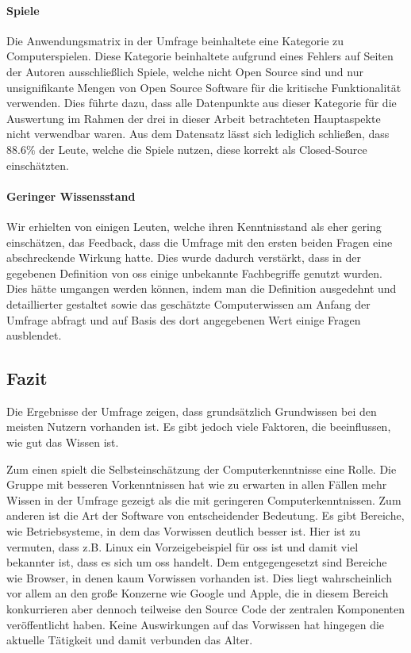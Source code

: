 \documentclass[a4paper]{article}
\begin{document}
            \paragraph{Spiele}
                Die Anwendungsmatrix in der Umfrage beinhaltete eine Kategorie zu Computerspielen. Diese Kategorie beinhaltete aufgrund eines Fehlers auf Seiten der Autoren ausschließlich Spiele, welche nicht Open Source sind und nur unsignifikante Mengen von Open Source Software für die kritische Funktionalität verwenden. Dies führte dazu, dass alle Datenpunkte aus dieser Kategorie für die Auswertung im Rahmen der drei in dieser Arbeit betrachteten Hauptaspekte nicht verwendbar waren. Aus dem Datensatz lässt sich lediglich schließen, dass $88.6\%$ der Leute, welche die Spiele nutzen, diese korrekt als Closed-Source einschätzten.
                
            \paragraph{Geringer Wissensstand}
                Wir erhielten von einigen Leuten, welche ihren Kenntnisstand als eher gering einschätzen, das Feedback, dass die Umfrage mit den ersten beiden Fragen eine abschreckende Wirkung hatte. Dies wurde dadurch verstärkt, dass in der gegebenen Definition von \gls{oss} einige unbekannte Fachbegriffe genutzt wurden. Dies hätte umgangen werden können, indem man die Definition ausgedehnt und detaillierter gestaltet sowie das geschätzte Computerwissen am Anfang der Umfrage abfragt und auf Basis des dort angegebenen Wert einige Fragen ausblendet.
            
        \subsection{Fazit}
            Die Ergebnisse der Umfrage zeigen, dass grundsätzlich Grundwissen bei den meisten Nutzern vorhanden ist. Es gibt jedoch viele Faktoren, die beeinflussen, wie gut das Wissen ist.
            
            Zum einen spielt die Selbsteinschätzung der Computerkenntnisse eine Rolle. Die Gruppe mit besseren Vorkenntnissen hat wie zu erwarten in allen Fällen mehr Wissen in der Umfrage gezeigt als die mit geringeren Computerkenntnissen.
            Zum anderen ist die Art der Software von entscheidender Bedeutung. Es gibt Bereiche, wie Betriebsysteme, in dem das Vorwissen deutlich besser ist. Hier ist zu vermuten, dass z.B. Linux ein Vorzeigebeispiel für \gls{oss} ist und damit viel bekannter ist, dass es sich um \gls{oss} handelt. Dem entgegengesetzt sind Bereiche wie Browser, in denen kaum Vorwissen vorhanden ist. Dies liegt wahrscheinlich vor allem an den große Konzerne wie Google und Apple, die in diesem Bereich konkurrieren aber dennoch teilweise den Source Code der zentralen Komponenten veröffentlicht haben.
            Keine Auswirkungen auf das Vorwissen hat hingegen die aktuelle Tätigkeit und damit verbunden das Alter.
            
\end{document}
